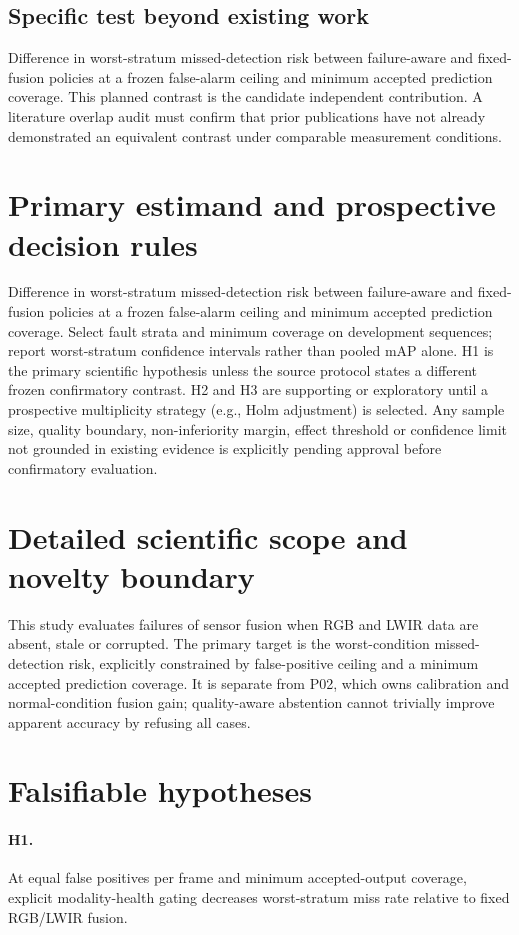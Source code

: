 \documentclass[11pt,a4paper]{article}
\begin{document}
\subsection{Specific test beyond existing work}
Difference in worst-stratum missed-detection risk between failure-aware and fixed-fusion policies at a frozen false-alarm ceiling and minimum accepted prediction coverage. This planned contrast is the candidate independent contribution. A literature overlap audit must confirm that prior publications have not already demonstrated an equivalent contrast under comparable measurement conditions.

\section{Primary estimand and prospective decision rules}
Difference in worst-stratum missed-detection risk between failure-aware and fixed-fusion policies at a frozen false-alarm ceiling and minimum accepted prediction coverage. Select fault strata and minimum coverage on development sequences; report worst-stratum confidence intervals rather than pooled mAP alone. H1 is the primary scientific hypothesis unless the source protocol states a different frozen confirmatory contrast. H2 and H3 are supporting or exploratory until a prospective multiplicity strategy (e.g., Holm adjustment) is selected. Any sample size, quality boundary, non-inferiority margin, effect threshold or confidence limit not grounded in existing evidence is explicitly pending approval before confirmatory evaluation.

\section{Detailed scientific scope and novelty boundary}
This study evaluates failures of sensor fusion when RGB and LWIR data are absent, stale or corrupted. The primary target is the worst-condition missed-detection risk, explicitly constrained by false-positive ceiling and a minimum accepted prediction coverage. It is separate from P02, which owns calibration and normal-condition fusion gain; quality-aware abstention cannot trivially improve apparent accuracy by refusing all cases.

\section{Falsifiable hypotheses}
\paragraph{H1.} At equal false positives per frame and minimum accepted-output coverage, explicit modality-health gating decreases worst-stratum miss rate relative to fixed RGB/LWIR fusion.
\end{document}
